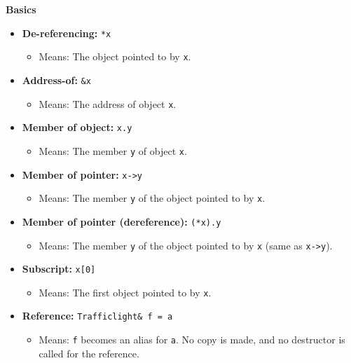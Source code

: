 \documentclass[fontsize=8pt, a4paper, landscape, fleqn]{scrartcl}
\renewcommand{\section}[1]{%
    \noindent\colorbox{sectioncolor}{%
        \parbox{\dimexpr\columnwidth-2\fboxsep}{\color{white}\textbf{#1}}}%
    \vspace{0.5mm}%
}
\begin{document}
\begin{multicols*}{3}[\raggedcolumns]
    \section{Basics}

\begin{itemize}
    \item \textbf{De-referencing:} \texttt{*x}
    \begin{itemize}
        \item Means: The object pointed to by \texttt{x}.
    \end{itemize}
    
    \item \textbf{Address-of:} \texttt{\&x}
    \begin{itemize}
        \item Means: The address of object \texttt{x}.
    \end{itemize}
    
    \item \textbf{Member of object:} \texttt{x.y}
    \begin{itemize}
        \item Means: The member \texttt{y} of object \texttt{x}.
    \end{itemize}
    
    \item \textbf{Member of pointer:} \texttt{x->y}
    \begin{itemize}
        \item Means: The member \texttt{y} of the object pointed to by \texttt{x}.
    \end{itemize}
    
    \item \textbf{Member of pointer (dereference):} \texttt{(*x).y}
    \begin{itemize}
        \item Means: The member \texttt{y} of the object pointed to by \texttt{x} (same as \texttt{x->y}).
    \end{itemize}
    
    \item \textbf{Subscript:} \texttt{x[0]}
    \begin{itemize}
        \item Means: The first object pointed to by \texttt{x}.
    \end{itemize}
    
    \item \textbf{Reference:} \texttt{Trafficlight\& f = a}
    \begin{itemize}
        \item Means: \texttt{f} becomes an alias for \texttt{a}. No copy is made, and no destructor is called for the reference.
    \end{itemize}
    

\end{itemize}
\end{multicols*}
\end{document}
